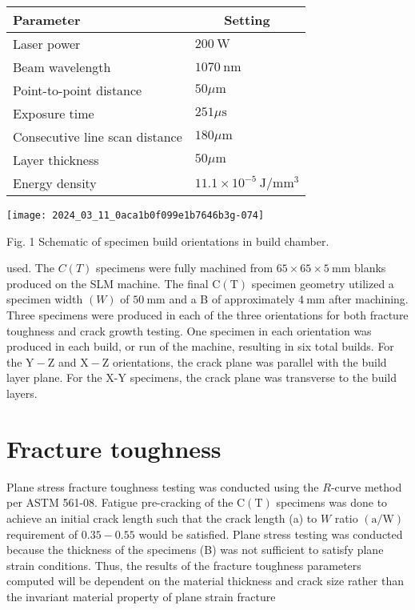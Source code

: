 \documentclass[10pt]{article}
\begin{document}
\begin{center}
\begin{tabular}{ll}
\hline
Parameter & \multicolumn{1}{c}{Setting} \\
\hline
Laser power & $200 \mathrm{~W}$ \\
Beam wavelength & $1070 \mathrm{~nm}$ \\
Point-to-point distance & $50 \mu \mathrm{m}$ \\
Exposure time & $251 \mu \mathrm{s}$ \\
Consecutive line scan distance & $180 \mu \mathrm{m}$ \\
Layer thickness & $50 \mu \mathrm{m}$ \\
Energy density & $11.1 \times 10^{-5} \mathrm{~J} / \mathrm{mm}^{3}$ \\
\hline
\end{tabular}
\end{center}

\begin{center}
\texttt{[image: 2024\_03\_11\_0aca1b0f099e1b7646b3g-074]}
\end{center}

Fig. 1 Schematic of specimen build orientations in build chamber.

used. The $C(T)$ specimens were fully machined from $65 \times 65 \times 5 \mathrm{~mm}$ blanks produced on the SLM machine. The final $\mathrm{C}(\mathrm{T})$ specimen geometry utilized a specimen width $(W)$ of $50 \mathrm{~mm}$ and a B of approximately $4 \mathrm{~mm}$ after machining. Three specimens were produced in each of the three orientations for both fracture toughness and crack growth testing. One specimen in each orientation was produced in each build, or run of the machine, resulting in six total builds. For the $\mathrm{Y}-\mathrm{Z}$ and $\mathrm{X}-\mathrm{Z}$ orientations, the crack plane was parallel with the build layer plane. For the X-Y specimens, the crack plane was transverse to the build layers.

\section*{Fracture toughness}
Plane stress fracture toughness testing was conducted using the $R$-curve method per ASTM 561-08. Fatigue pre-cracking of the $\mathrm{C}(\mathrm{T})$ specimens was done to achieve an initial crack length such that the crack length (a) to $W$ ratio $(\mathrm{a} / \mathrm{W})$ requirement of $0.35-0.55$ would be satisfied. Plane stress testing was conducted because the thickness of the specimens (B) was not sufficient to satisfy plane strain conditions. Thus, the results of the fracture toughness parameters computed will be dependent on the material thickness and crack size rather than the invariant material property of plane strain fracture
\end{document}
